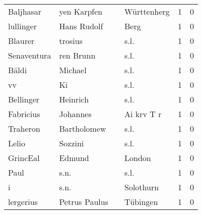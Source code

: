 \documentclass[10pt,a4paper,landscape]{article}
\begin{document}
\begin{longtable}{llllrr}
                Baljhasar &                        yen Karpfen &             &                                 Württenherg &          1 &         0 \\
                lullinger &                        Hans Rudolf &             &                                        Berg &          1 &         0 \\
                  Blaurer &                            trosius &             &                                        s.l. &          1 &         0 \\
              Senaventura &                          ren Brunn &             &                                        s.l. &          1 &         0 \\
                    Bäldi &                            Michael &             &                                        s.l. &          1 &         0 \\
                       vv &                                 Ki &             &                                        s.l. &          1 &         0 \\
                Bellinger &                           Heinrich &             &                                        s.l. &          1 &         0 \\
                Fabricius &                           Johannes &             &                                  Ai krv T r &          1 &         0 \\
                 Traheron &                        Bartholomew &             &                                        s.l. &          1 &         0 \\
                    Lelio &                            Sozzini &             &                                        s.l. &          1 &         0 \\
                 GrincEal &                             Edmund &             &                                      London &          1 &         0 \\
                     Paul &                               s.n. &             &                                        s.l. &          1 &         0 \\
                        i &                               s.n. &             &                                   Solothurn &          1 &         0 \\
                lergerius &                      Petrus Paulus &             &                                    Tübingen &          1 &         0 \\

\end{longtable}
\end{document}
